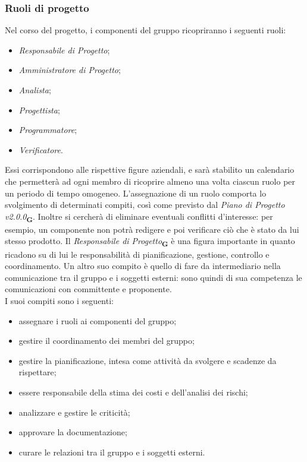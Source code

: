\subsubsection{Ruoli di progetto}
Nel corso del progetto, i componenti del gruppo ricopriranno i seguenti ruoli:
\begin {itemize}
\item \textit{Responsabile di Progetto};
\item \textit{Amministratore di Progetto};
\item \textit{Analista};
\item \textit{Progettista};
\item \textit{Programmatore};
\item \textit{Verificatore}.
\end {itemize}
Essi corrispondono alle rispettive figure aziendali, e sarà stabilito un calendario che permetterà ad ogni membro di ricoprire almeno una volta ciascun ruolo per un periodo di tempo omogeneo. L’assegnazione di un ruolo comporta lo svolgimento di determinati compiti, così come previsto dal \textit{Piano di Progetto v2.0.0}\textsubscript{\textbf{G}}. Inoltre si cercherà di eliminare eventuali conflitti d'interesse: per esempio, un componente non potrà redigere e poi verificare ciò che è stato da lui stesso prodotto.
Il \textit{Responsabile di Progetto}\textsubscript{\textbf{G}} è una figura importante in quanto ricadono su di lui le responsabilità di pianificazione, gestione, controllo e coordinamento. Un altro suo compito è quello di fare da intermediario nella comunicazione tra il gruppo e i soggetti esterni: sono quindi di sua competenza le comunicazioni con committente e proponente.\\
I suoi compiti sono i seguenti:
\begin {itemize}
\item assegnare i ruoli ai componenti del gruppo;
\item gestire il coordinamento dei membri del gruppo;
\item gestire la pianificazione, intesa come attività da svolgere e scadenze da rispettare;
\item essere responsabile della stima dei costi e dell’analisi dei rischi;
\item analizzare e gestire le criticità;
\item approvare la documentazione;
\item curare le relazioni tra il gruppo e i soggetti esterni.
\end {itemize}
